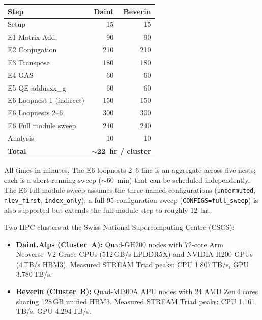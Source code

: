 \documentclass[conference]{IEEEtran}
\begin{document}
\arttime
\begin{center}
\small
\begin{tabular}{lrr}
\toprule
Step & Daint & Beverin \\
\midrule
Setup                          &  15 &  15 \\
E1 Matrix Add.                 &  90 &  90 \\
E2 Conjugation                 & 210 & 210 \\
E3 Transpose                   & 180 & 180 \\
E4 GAS                         &  60 &  60 \\
E5 QE addusxx\_g               &  60 &  60 \\
E6 Loopnest 1 (indirect)       & 150 & 150 \\
E6 Loopnests 2--6              & 300 & 300 \\
E6 Full module sweep           & 240 & 240 \\
Analysis                       &  10 &  10 \\
\midrule
\textbf{Total}                 & \multicolumn{2}{c}{\textbf{$\sim$22~hr / cluster}} \\
\bottomrule
\end{tabular}
\end{center}
\noindent All times in minutes.
The E6 loopnests 2--6 line is an aggregate across five nests; each is a short-running sweep ($\sim$60~min) that can be scheduled independently.
The E6 full-module sweep assumes the three named configurations (\texttt{unpermuted}, \texttt{nlev\_first}, \texttt{index\_only}); a full 95-configuration sweep (\texttt{CONFIGS=full\_sweep}) is also supported but extends the full-module step to roughly 12~hr.

\artin


Two HPC clusters at the Swiss National Supercomputing Centre (CSCS):

\begin{itemize}
\item \textbf{Daint.Alps (Cluster~A):} Quad-GH200 nodes with 72-core Arm Neoverse~V2 Grace CPUs (512\,GB/s LPDDR5X) and NVIDIA H200 GPUs (4\,TB/s HBM3).
Measured STREAM Triad peaks: CPU 1.807\,TB/s, GPU 3.780\,TB/s.
\item \textbf{Beverin (Cluster~B):} Quad-MI300A APU nodes with 24 AMD Zen\,4 cores sharing 128\,GB unified HBM3.
Measured STREAM Triad peaks: CPU 1.161\,TB/s, GPU 4.294\,TB/s.
\end{itemize}
\end{document}
